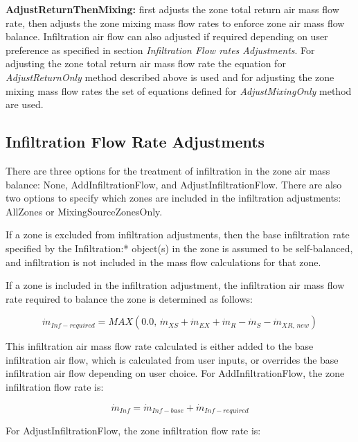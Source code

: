 \textbf{AdjustReturnThenMixing:} first adjusts the zone total return air mass flow rate, then adjusts the zone mixing mass flow rates to enforce zone air mass flow balance. Infiltration air flow can also adjusted if required depending on user preference as specified in section \textit{Infiltration Flow rates Adjustments}. For adjusting the zone total return air mass flow rate the equation for \textit{AdjustReturnOnly} method described above is used and for adjusting the zone mixing mass flow rates the set of equations defined for \textit{AdjustMixingOnly} method are used.

\subsection{Infiltration Flow Rate Adjustments}\label{infiltration-flow-rate-adjustments}

There are three options for the treatment of infiltration in the zone air mass balance: None, AddInfiltrationFlow, and AdjustInfiltrationFlow. There are also two options to specify which zones are included in the infiltration adjustments: AllZones or MixingSourceZonesOnly.

If a zone is excluded from infiltration adjustments, then the base infiltration rate specified by the Infiltration:* object(s) in the zone is assumed to be self-balanced, and infiltration is not included in the mass flow calculations for that zone.

If a zone is included in the infiltration adjustment, the infiltration air mass flow rate required to balance the zone is determined as follows:

\begin{equation}
{\dot m_{Inf-required}} = MAX\left( {0.0,\,{{\dot m}_{XS}} + {{\dot m}_{EX}} + {{\dot m}_{R}} - {{\dot m}_S}  - {\dot m_{XR,\,new}}} \right)
\end{equation}

This infiltration air mass flow rate calculated is either added to the base infiltration air flow, which is calculated from user inputs, or overrides the base infiltration air flow depending on user choice. For AddInfiltrationFlow, the zone infiltration flow rate is:

\begin{equation}
{\dot m_{Inf}} = {\dot m_{Inf-base}} + {\dot m_{Inf-required}}
\end{equation}

For AdjustInfiltrationFlow, the zone infiltration flow rate is:

